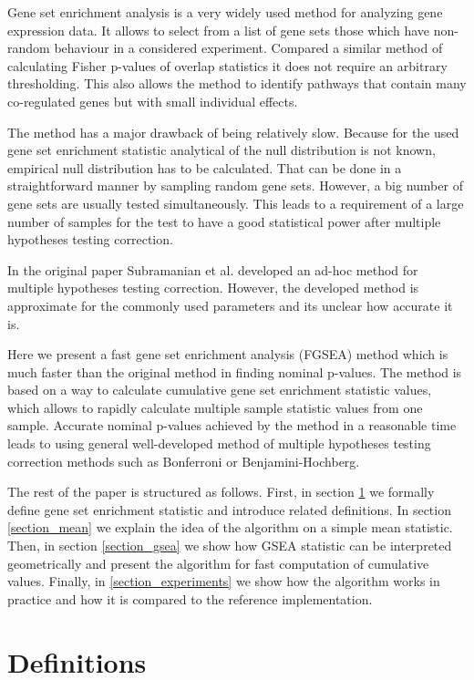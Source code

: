 \documentclass[runningheads,a4paper]{llncs}
\begin{document}
Gene set enrichment analysis is a very widely used method for analyzing 
gene expression data. It allows to select from a list of gene sets those
which have non-random behaviour in a considered experiment. Compared
a similar method of calculating Fisher p-values of overlap statistics
it does not require an arbitrary thresholding. This also allows the method
to identify pathways that contain many co-regulated genes but with small 
individual effects.

The method has a major drawback of being relatively slow. Because for
the used gene set enrichment statistic analytical of the null distribution
is not known, empirical null distribution has to be calculated. That can be
done in a straightforward manner by sampling random gene sets. However,
a big number of gene sets are usually tested simultaneously. This leads to
a requirement of a large number of samples 
for the test to have a good statistical power after multiple hypotheses 
testing correction.

In the original paper \cite{Subramanian2005} Subramanian et al. developed
an ad-hoc method for multiple hypotheses testing correction.
However, the developed method is approximate for the commonly used
parameters and its unclear how accurate it is.

Here we present a fast gene set enrichment analysis (FGSEA) method 
which is much faster than the original method \cite{Subramanian2005}
in finding nominal p-values. The method is based on a
way to calculate cumulative gene set enrichment statistic
values, which allows to rapidly calculate multiple sample
statistic values from one sample. Accurate nominal p-values
achieved by the method in a reasonable time leads to using
general well-developed method of multiple hypotheses testing
correction methods such as Bonferroni or Benjamini-Hochberg.

The rest of the paper is structured as follows. First,
in section \ref{section_definitions} we formally define
gene set enrichment statistic and introduce related definitions.
In section \ref{section_mean}
we explain the idea of the algorithm on a simple mean statistic.
Then, in section \ref{section_gsea} we show how GSEA statistic
can be interpreted geometrically and present the algorithm
for fast computation of cumulative values. Finally,
in \ref{section_experiments} we show how the algorithm works
in practice and how it is compared to the reference implementation.

\section{Definitions}\label{section_definitions}
\end{document}
